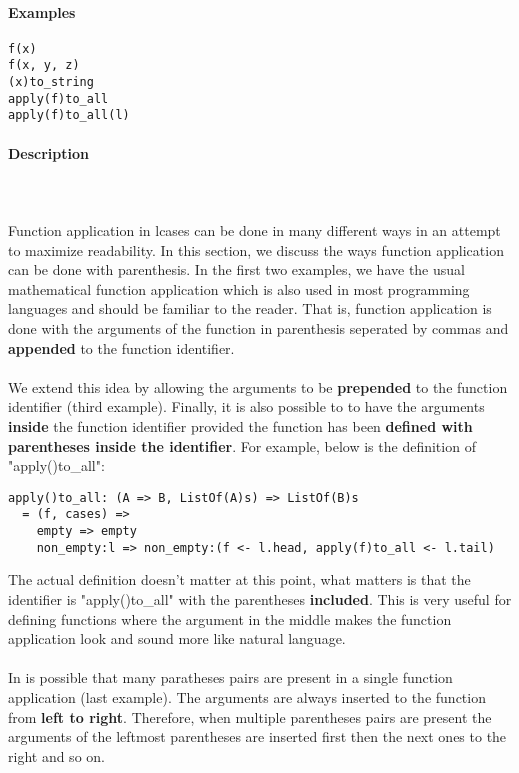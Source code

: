 \documentclass{article}
\def\pend{\mbox{} \\\\}
\begin{document}
\paragraph{Examples}

\begin{verbatim}
f(x)
f(x, y, z)
(x)to_string
apply(f)to_all
apply(f)to_all(l)
\end{verbatim}

\paragraph{Description}\pend
Function application in lcases can be done in many different ways in an attempt to 
maximize readability. In this section, we discuss the ways function application can
be done with parenthesis. In the first two examples, we have the usual mathematical
function application which is also used in most programming languages and
should be familiar to the reader. That is, function application is done with the 
arguments of the function in parenthesis seperated by commas and \textbf{appended}
to the function identifier.
\\\\
We extend this idea by allowing the arguments to be \textbf{prepended} to the
function identifier (third example). Finally, it is also possible to to have
the arguments \textbf{inside} the function identifier provided the function has
been \textbf{defined with parentheses inside the identifier}. For example,
below is the definition of "apply()to\_all":

\begin{verbatim}
apply()to_all: (A => B, ListOf(A)s) => ListOf(B)s
  = (f, cases) =>
    empty => empty
    non_empty:l => non_empty:(f <- l.head, apply(f)to_all <- l.tail)
\end{verbatim}
The actual definition doesn't matter at this point, what matters is that the 
identifier is "apply()to\_all" with the parentheses \textbf{included}. This is very
useful for defining functions where the argument in the middle makes the function
application look and sound more like natural language.
\\\\
In is possible that many paratheses pairs are present in a single function
application (last example). The arguments are always inserted to the function
from \textbf{left to right}.  Therefore, when multiple parentheses pairs are
present the arguments of the leftmost parentheses are inserted first then the
next ones to the right and so on.
\end{document}
